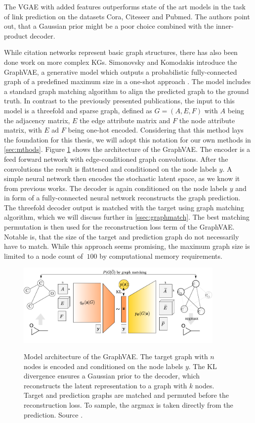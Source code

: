The VGAE with added features outperforms state of the art models in the task of link prediction on the datasets Cora, Citeseer and Pubmed. The authors point out, that a Gaussian prior might be a poor choice combined with the inner-product decoder.

While citation networks represent basic graph structures, there has also been done work on more complex KGs.
Simonovsky and Komodakis introduce the GraphVAE, a generative model which outputs a probabilistic fully-connected graph of a predefined maximum size
in a one-shot approach \cite{simonovsky_graphvae_2018}. The model includes a standard graph matching algorithm to align the predicted graph to the ground truth. In contrast to the previously presented publications, the input to this model is a threefold and sparse graph, defined as $G=(A, E, F)$ with $A$ being the adjacency matrix, $E$ the edge attribute matrix and $F$ the node attribute matrix, with $E$ ad $F$ being one-hot encoded. Considering that this method lays the foundation for this thesis, we will adopt this notation for our own methods in \ref{sec:mthods}. Figure \ref{fig:graphvaefull} shows the architecture of the GraphVAE. The encoder is a feed forward network with edge-conditioned graph convolutions. After the convolutions the result is flattened and conditioned on the node labels $y$. A simple neural network then encodes the stochastic latent space, as we know it from previous works. The decoder is again conditioned on the node labels $y$ and in form of a fully-connected neural network reconstructs the graph prediction. The threefold decoder output is matched with the target using graph matching algorithm, which we will discuss further in \ref{ssec:graphmatch}. The best matching permutation is then used for the reconstruction loss term of the GraphVAE. Notable is, that the size of the target and prediction graph do not necessarily have to match. While this approach seems promising, the maximum graph size is limited to a node count of $~100$ by computational memory requirements.

\begin{figure}[h]
    \centering
    \includegraphics[width=0.9\textwidth]{data/images/GraphVAEfull.png}
    \label{fig:graphvaefull}
    \caption{Model architecture of the GraphVAE. The target graph with $n$ nodes is encoded and conditioned on the node labels $y$. The KL divergence ensures a Gaussian prior to the decoder, which reconstructs the latent representation to a graph with $k$ nodes. Target and prediction graphs are matched and permuted before the reconstruction loss. To sample, the argmax is taken directly from the prediction. Source \cite{simonovsky_graphvae_2018}.}
\end{figure}

